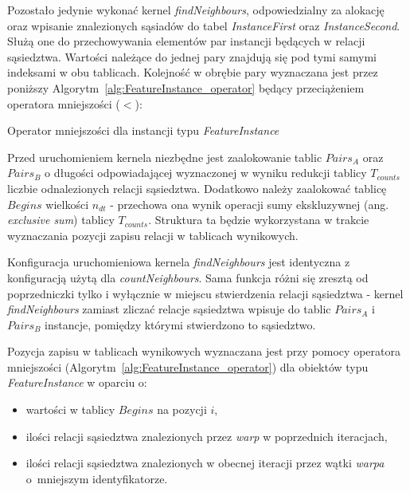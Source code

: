 \documentclass[12pt]{article}
\begin{document}
Pozostało jedynie wykonać kernel \textit{findNeighbours}, odpowiedzialny za alokację oraz wpisanie znalezionych sąsiadów do tabel \textit{InstanceFirst} oraz \textit{InstanceSecond}. Służą one do przechowywania elementów par instancji będących w relacji sąsiedztwa. Wartości należące do jednej pary znajdują się pod tymi samymi indeksami w obu tablicach. Kolejność w obrębie pary wyznaczana jest przez poniższy Algorytm~\ref{alg:FeatureInstance_operator} będący przeciążeniem operatora mniejszości ($ < $):

\begin{algorithm}
\caption{Operator mniejszości dla instancji typu \textit{FeatureInstance}}
\label{alg:FeatureInstance_operator}
\end{algorithm}

Przed uruchomieniem kernela niezbędne jest zaalokowanie tablic $ Pairs_{A} $ oraz $ Pairs_{B}$ o długości odpowiadającej wyznaczonej w wyniku redukcji tablicy $ T_{counts} $ liczbie odnalezionych relacji sąsiedztwa. Dodatkowo należy zaalokować tablicę $ Begins $ wielkości $ n_{dt} $ - przechowa ona wynik operacji sumy ekskluzywnej (ang. \textit{exclusive sum}) tablicy $ T_{counts} $. Struktura ta będzie wykorzystana w trakcie wyznaczania pozycji zapisu relacji w tablicach wynikowych.

Konfiguracja uruchomieniowa kernela \textit{findNeighbours} jest identyczna z konfiguracją użytą dla \textit{countNeighbours}. Sama funkcja różni się zresztą od poprzedniczki tylko i wyłącznie w miejscu stwierdzenia relacji sąsiedztwa - kernel \textit{findNeighbours} zamiast zliczać relacje sąsiedztwa wpisuje do tablic $ Pairs_{A} $ i $ Pairs_{B}$ instancje, pomiędzy którymi stwierdzono to sąsiedztwo. 

Pozycja zapisu w tablicach wynikowych wyznaczana jest przy pomocy operatora mniejszości (Algorytm~\ref{alg:FeatureInstance_operator}) dla obiektów typu \textit{FeatureInstance} w oparciu o:

\begin{itemize}
\item wartości w tablicy $ Begins $ na pozycji $i$,
\item ilości relacji sąsiedztwa znalezionych przez \textit{warp} w poprzednich iteracjach,
\item ilości relacji sąsiedztwa znalezionych w obecnej iteracji przez wątki \textit{warpa} o~mniejszym identyfikatorze. 
\end{itemize}
\end{document}
